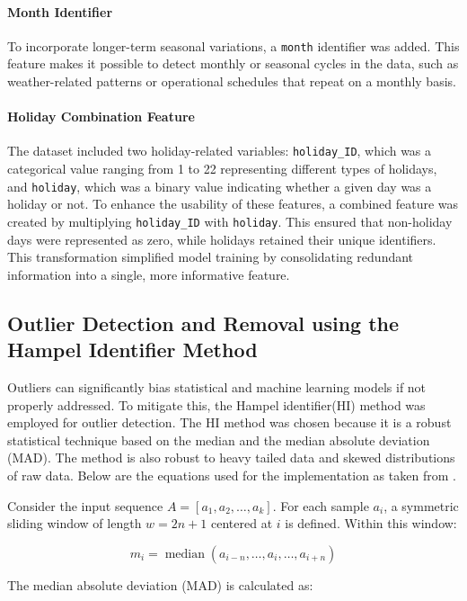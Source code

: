 \paragraph{Month Identifier}
To incorporate longer-term seasonal variations, a \texttt{month} identifier was added. This feature makes it possible to detect monthly or seasonal cycles in the data, such as weather-related patterns or operational schedules that repeat on a monthly basis.

\paragraph{Holiday Combination Feature}
The dataset included two holiday-related variables: \texttt{holiday\_ID}, which was a categorical value ranging from 1 to 22 representing different types of holidays, and \texttt{holiday}, which was a binary value indicating whether a given day was a holiday or not. To enhance the usability of these features, a combined feature was created by multiplying \texttt{holiday\_ID} with \texttt{holiday}. This ensured that non-holiday days were represented as zero, while holidays retained their unique identifiers. This transformation simplified model training by consolidating redundant information into a single, more informative feature.

\subsection{Outlier Detection and Removal using the Hampel Identifier Method \label{sec:HI_method}}
Outliers can significantly bias statistical and machine learning models if not properly addressed. To mitigate this, the Hampel identifier(HI) method was employed for outlier detection. The HI method was chosen because it is a robust statistical technique based on the median and the median absolute deviation (MAD)\cite{hiceemdanQteg}. The method is also robust to heavy tailed data and skewed distributions of raw data. Below are the equations used for the implementation as taken from \cite{hiceemdanQteg}.

Consider the input sequence \(A = [a_1, a_2, \ldots, a_k]\). For each sample \(a_i\), a symmetric sliding window of length \(w = 2n + 1\) centered at \(i\) is defined. Within this window:

\[
m_i = \operatorname{median}(a_{i-n}, \ldots, a_i, \ldots, a_{i+n})
\tag{1}
\]

The median absolute deviation (MAD) is calculated as:

